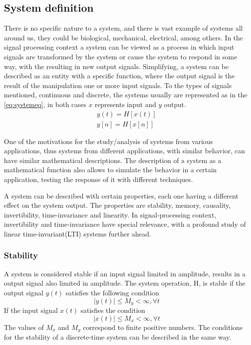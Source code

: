 \subsection{System definition}\label{subsec:SysDef}
There is no specific nature to a system, and there is vast example of systems all around us, they could be biological, mechanical, electrical, among others. In the signal processing context a system can be viewed as a process in which input signals are transformed by the system or cause the system to respond in some way, with the resulting in new output signals. Simplifying, a system can be described as an entity with a specific function, where the output signal is the result of the manipulation one or more input signals.
To the types of signals mentioned, continuous and discrete, the systems usually are represented as in the \ref{eq:systemeq}, in both cases $x$ represents input and $y$ output.
\begin{equation} \label{eq:systemeq}
    \begin{split}
        y(t) = H[x(t)] \\
        y[n] = H[x[n]]
    \end{split}
\end{equation}

One of the motivations for the study/analysis of systems from various applications, thus systems from different applications, with similar behavior, can have similar mathematical descriptions. The description of a system as a mathematical function also allows to simulate the behavior in a certain application, testing the response of it with different techniques. 

A system can be described with certain properties, each one having a different effect on the system output. The properties are stability, memory, causality, invertibility, time-invariance and linearity. In signal-processing context, invertibility and time-invariance have special relevance, with a profound study of linear time-invariant(LTI) systems further ahead.\cite{oppenheimSignalsSystems1997}
\subsubsection*{Stability}
A system is considered stable if an input signal limited in amplitude, results in a output signal also limited in amplitude. The system operation, H, is stable if the output signal $y(t)$  satisfies the following condition
\begin{equation}
    |y(t)|\leq M_y < \infty , \forall t
\end{equation}
If the input signal $x(t)$ satisfies the condition
\begin{equation}
    |x(t)|\leq M_x < \infty , \forall t
\end{equation}
The values of $M_x$ and $M_y$ correspond to finite positive numbers. The conditions for the stability of a discrete-time system can be described in the same way.
